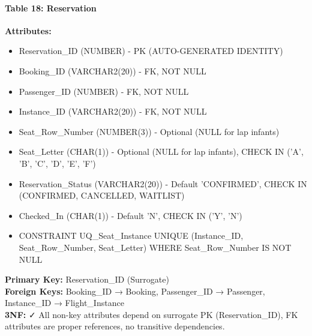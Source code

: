 \documentclass[12pt,a4paper,openany]{report}
\begin{document}
\paragraph{Table 18: Reservation}
\textbf{Attributes:} 
\begin{itemize}
    \item Reservation\_ID (NUMBER) - PK (AUTO-GENERATED IDENTITY)
    \item Booking\_ID (VARCHAR2(20)) - FK, NOT NULL
    \item Passenger\_ID (NUMBER) - FK, NOT NULL
    \item Instance\_ID (VARCHAR2(20)) - FK, NOT NULL
    \item Seat\_Row\_Number (NUMBER(3)) - Optional (NULL for lap infants)
    \item Seat\_Letter (CHAR(1)) - Optional (NULL for lap infants), CHECK IN ('A', 'B', 'C', 'D', 'E', 'F')
    \item Reservation\_Status (VARCHAR2(20)) - Default 'CONFIRMED', CHECK IN (CONFIRMED, CANCELLED, WAITLIST)
    \item Checked\_In (CHAR(1)) - Default 'N', CHECK IN ('Y', 'N')
    \item CONSTRAINT UQ\_Seat\_Instance UNIQUE (Instance\_ID, Seat\_Row\_Number, Seat\_Letter) WHERE Seat\_Row\_Number IS NOT NULL
\end{itemize}
\textbf{Primary Key:} Reservation\_ID (Surrogate)\\
\textbf{Foreign Keys:} Booking\_ID → Booking, Passenger\_ID → Passenger, Instance\_ID → Flight\_Instance\\
\textbf{3NF:} ✓ All non-key attributes depend on surrogate PK (Reservation\_ID), FK attributes are proper references, no transitive dependencies.
\end{document}
